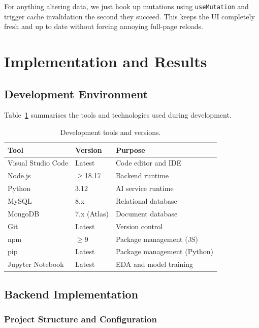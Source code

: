 \documentclass[12pt,a4paper]{article}
\begin{document}
For anything altering data, we just hook up mutations using \texttt{useMutation} and trigger cache invalidation the second they succeed. This keeps the UI completely fresh and up to date without forcing annoying full-page reloads.


\clearpage
\section{Implementation and Results}

\subsection{Development Environment}

Table~\ref{tab:dev-tools} summarises the tools and technologies used during
development.

\begin{table}[H]
  \centering
  \singlespacing
  \caption{Development tools and versions.}
  \label{tab:dev-tools}
  \begin{tabular}{@{}lll@{}}
    \toprule
    \textbf{Tool} & \textbf{Version} & \textbf{Purpose} \\
    \midrule
    Visual Studio Code    & Latest     & Code editor and IDE \\
    Node.js               & $\geq$18.17 & Backend runtime \\
    Python                & 3.12       & AI service runtime \\
    MySQL                 & 8.x        & Relational database \\
    MongoDB               & 7.x (Atlas) & Document database \\
    Git                   & Latest     & Version control \\
    npm                   & $\geq$9    & Package management (JS) \\
    pip                   & Latest     & Package management (Python) \\
    Jupyter Notebook      & Latest     & EDA and model training \\
    \bottomrule
  \end{tabular}
\end{table}

\subsection{Backend Implementation}

\subsubsection{Project Structure and Configuration}
\end{document}
